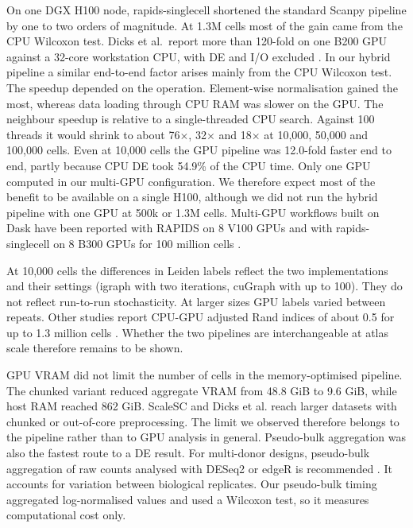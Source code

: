 \documentclass[runningheads]{llncs}
\begin{document}
On one DGX H100 node, rapids-singlecell shortened the standard Scanpy pipeline by one to two orders of magnitude.
At 1.3M cells most of the gain came from the CPU Wilcoxon test.
Dicks et al.~report more than 120-fold on one B200 GPU against a 32-core workstation CPU, with DE and I/O excluded \cite{Dicks2026}.
In our hybrid pipeline a similar end-to-end factor arises mainly from the CPU Wilcoxon test.
The speedup depended on the operation.
Element-wise normalisation gained the most, whereas data loading through CPU RAM was slower on the GPU.
The neighbour speedup is relative to a single-threaded CPU search.
Against 100 threads it would shrink to about 76$\times$, 32$\times$ and 18$\times$ at 10,000, 50,000 and 100,000 cells.
Even at 10,000 cells the GPU pipeline was 12.0-fold faster end to end, partly because CPU DE took 54.9\% of the CPU time.
Only one GPU computed in our multi-GPU configuration.
We therefore expect most of the benefit to be available on a single H100, although we did not run the hybrid pipeline with one GPU at 500k or 1.3M cells.
Multi-GPU workflows built on Dask have been reported with RAPIDS on 8 V100 GPUs \cite{Nolet2022} and with rapids-singlecell on 8 B300 GPUs for 100 million cells \cite{Dicks2026}.

At 10,000 cells the differences in Leiden labels reflect the two implementations and their settings (igraph with two iterations, cuGraph with up to 100).
They do not reflect run-to-run stochasticity.
At larger sizes GPU labels varied between repeats.
Other studies report CPU-GPU adjusted Rand indices of about 0.5 for up to 1.3 million cells \cite{Nolet2022,Gardner2025}.
Whether the two pipelines are interchangeable at atlas scale therefore remains to be shown.

GPU VRAM did not limit the number of cells in the memory-optimised pipeline.
The chunked variant reduced aggregate VRAM from 48.8 GiB to 9.6 GiB, while host RAM reached 862 GiB.
ScaleSC \cite{Hu2025} and Dicks et al. \cite{Dicks2026} reach larger datasets with chunked or out-of-core preprocessing.
The limit we observed therefore belongs to the pipeline rather than to GPU analysis in general.
Pseudo-bulk aggregation was also the fastest route to a DE result.
For multi-donor designs, pseudo-bulk aggregation of raw counts analysed with DESeq2 \cite{Love2014} or edgeR \cite{Robinson2010} is recommended \cite{Squair2021}.
It accounts for variation between biological replicates.
Our pseudo-bulk timing aggregated log-normalised values and used a Wilcoxon test, so it measures computational cost only.
\end{document}
